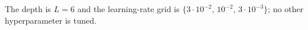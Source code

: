 \providecommand{\UnfoldingLayers}{6}
\providecommand{\UnfoldLRgrid}{$\{3\cdot10^{-2},\,10^{-2},\,3\cdot10^{-3}\}$}
The depth is $L = \UnfoldingLayers$ and the learning-rate grid is
\UnfoldLRgrid{}; no other hyperparameter is tuned.
